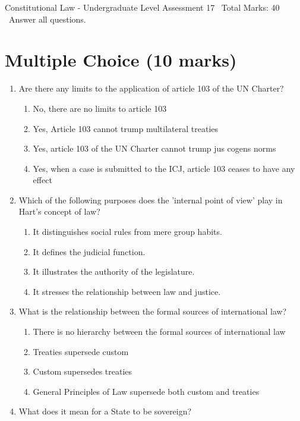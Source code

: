\documentclass[12pt]{article}
\begin{document}
\begin{center}
Constitutional Law - Undergraduate Level Assessment 17 \
Total Marks: 40 \
Answer all questions.
\end{center}

\section*{Multiple Choice (10 marks)}
\begin{enumerate}[label=\arabic*.]
\item Are there any limits to the application of article 103 of the UN Charter?
\begin{enumerate}[label=(\alph*)]
    \item No, there are no limits to article 103
    \item Yes, Article 103 cannot trump multilateral treaties
    \item Yes, article 103 of the UN Charter cannot trump jus cogens norms
    \item Yes, when a case is submitted to the ICJ, article 103 ceases to have any effect
\end{enumerate}
\item Which of the following purposes does the 'internal point of view' play in Hart's concept of law?
\begin{enumerate}[label=(\alph*)]
    \item It distinguishes social rules from mere group habits.
    \item It defines the judicial function.
    \item It illustrates the authority of the legislature.
    \item It stresses the relationship between law and justice.
\end{enumerate}
\item What is the relationship between the formal sources of international law?
\begin{enumerate}[label=(\alph*)]
    \item There is no hierarchy between the formal sources of international law
    \item Treaties supersede custom
    \item Custom supersedes treaties
    \item General Principles of Law supersede both custom and treaties
\end{enumerate}
\item What does it mean for a State to be sovereign?
\begin{enumerate}[label=(\alph*)]

\end{enumerate}
\end{enumerate}
\end{document}
